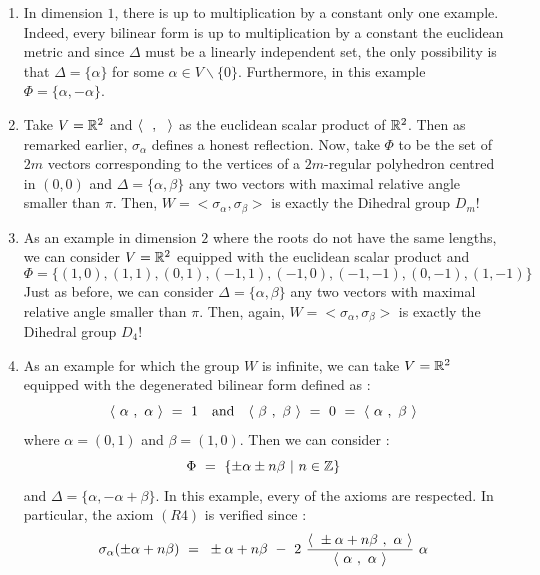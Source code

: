 \begin{enumerate}
	\item In dimension $1$, there is up to multiplication by a constant only one example. Indeed, every bilinear form is up to multiplication by a constant the euclidean metric and since $\Delta$ must be a linearly independent set, the only possibility is that $\Delta=\{\alpha\}$ for some $\alpha\in V\backslash\{0\}$. Furthermore, in this example $\Phi=\{\alpha,-\alpha\}$.
	\item Take $V=\mathbb R^2$ and $\langle\text{ } \text{ },\text{ }\text{ }\rangle$ as the euclidean scalar product of $\mathbb R^2$. Then as remarked earlier, $\sigma_\alpha$ defines a honest reflection. Now, take $\Phi$ to be the set of $2m$ vectors corresponding to the vertices of a $2m$-regular polyhedron centred in $(0,0)$ and $\Delta=\{\alpha,\beta\}$ any two vectors with maximal relative angle smaller than $\pi$. Then, $W=<\sigma_\alpha,\sigma_\beta>$ is exactly the Dihedral group $D_m$!
	\item As an example in dimension $2$ where the roots do not have the same lengths, we can consider $V=\mathbb R^2$ equipped with the euclidean scalar product and
	\begin{equation}
	\Phi=\{(1,0),(1,1),(0,1),(-1,1),(-1,0),(-1,-1),(0,-1),(1,-1)\}
	\end{equation}
	Just as before, we can consider $\Delta=\{\alpha,\beta\}$ any two vectors with maximal relative angle smaller than $\pi$. Then, again, $W=<\sigma_\alpha,\sigma_\beta >$ is exactly the Dihedral group $D_4$!
	\item As an example for which the group $W$ is infinite, we can take $V=\mathbb R^2$ equipped with the degenerated bilinear form defined as :
	\begin{equation}
	\langle\text{ } \alpha\text{ },\text{ }\alpha\text{ }\rangle\text{ }=\text{ } 1\quad\mbox{and}\quad \langle\text{ } \beta\text{ },\text{ }\beta\text{ }\rangle\text{ }=\text{ } 0\text{ }=\text{ }\langle\text{ } \alpha\text{ },\text{ }\beta\text{ }\rangle
	\end{equation}
	where $\alpha=(0,1)$ and $\beta=(1,0)$. Then we can consider :
	\begin{equation}
	\Phi\text{ }=\text{ } \{\pm \alpha\pm n\beta\text{ }\lvert\text{ } n\in \mathbb Z \}
	\end{equation}
	and $\Delta=\{\alpha,-\alpha+\beta\}$. In this example, every of the axioms are respected. In particular, the axiom $(R4)$ is verified since :
	\begin{equation}
	\begin{split}
	\sigma_\alpha(\pm\alpha +n\beta)\qq&=\qq \pm\alpha +n\beta\qq -\qq 2\qq \frac{\prods{\pm\alpha +n\beta}{\alpha}}{\prods{\alpha}{\alpha}}\qq\alpha \\

\end{split}
\end{equation}
\end{enumerate}
